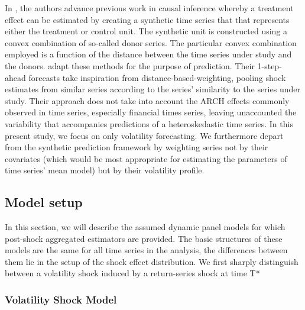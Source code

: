 \documentclass[11pt]{article}
\theoremstyle{definition}
\begin{document}
In \citet{abadie2010synthetic}, the authors advance previous work in causal inference whereby a treatment effect can be estimated by creating a synthetic time series that that represents either the treatment or control unit.  The synthetic unit is constructed using a convex combination of so-called donor series.  The particular convex combination employed is a function of the distance between the time series under study and the donors. \citet{lin2021minimizing} adapt these methods for the purpose of prediction.  Their 1-step-ahead forecasts take inspiration from distance-based-weighting, pooling shock estimates from similar series according to the series' similarity to the series under study.  Their approach does not take into account the ARCH effects commonly observed in time series, especially financial times series, leaving unaccounted the variability that accompanies predictions of a heteroskedastic time series.  In this present study, we focus on only volatility forecasting.  We furthermore depart from the synthetic prediction framework by weighting series not by their covariates (which would be most appropriate for estimating the parameters of time series' mean model) but by their volatility profile.


\subsection{Model setup}
\label{modelsetup}
In this section, we will describe the assumed dynamic panel models for which 
post-shock aggregated estimators are provided. The basic structures of these models 
are the same for all time series in the analysis, the differences between them lie in the setup of the shock effect distribution.  We first sharply distinguish between a volatility shock induced by a return-series shock at time T*




\subsubsection{Volatility Shock Model}
\end{document}
